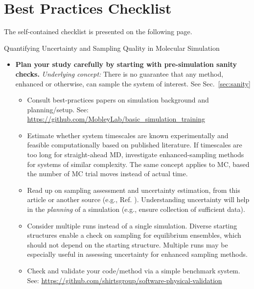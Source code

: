 \section{Best Practices Checklist}

The self-contained checklist is presented on the following page.

\begin{Checklists*}[p!]
\begin{checklist}{Quantifying Uncertainty and Sampling Quality in Molecular Simulation}
\begin{itemize}

\item
  \textbf{Plan your study carefully by starting with pre-simulation sanity checks.}
  \emph{Underlying concept:} There is no guarantee that any method, enhanced or otherwise, can sample the system of interest.
  See Sec.\ \ref{sec:sanity}
    \begin{itemize}
    \item Consult best-practices papers on simulation background and planning/setup.
      See: \url{https://github.com/MobleyLab/basic_simulation_training}
    \item Estimate whether system timescales are known experimentally and feasible computationally based on published literature.
      If timescales are too long for straight-ahead MD, investigate enhanced-sampling methods for systems of similar complexity.
      The same concept applies to MC, based the number of MC trial moves instead of actual time.
    \item Read up on sampling assessment and uncertainty estimation, from this article or another source (e.g., Ref. \cite{Grossfield2009}).
      Understanding uncertainty will help in the \emph{planning} of a simulation (e.g., ensure collection of sufficient data).
    \item Consider multiple runs instead of a single simulation.
      Diverse starting structures enable a check on sampling for equilibrium ensembles, which should not depend on the starting structure.
      Multiple runs may be especially useful in assessing uncertainty for enhanced sampling methods.
    \item Check and validate your code/method via a simple benchmark system.
      See: \url{https://github.com/shirtsgroup/software-physical-validation}
    \end{itemize}
    \vspace{-0.325\baselineskip} %
    

\end{itemize}
\end{checklist}
\end{Checklists*}
